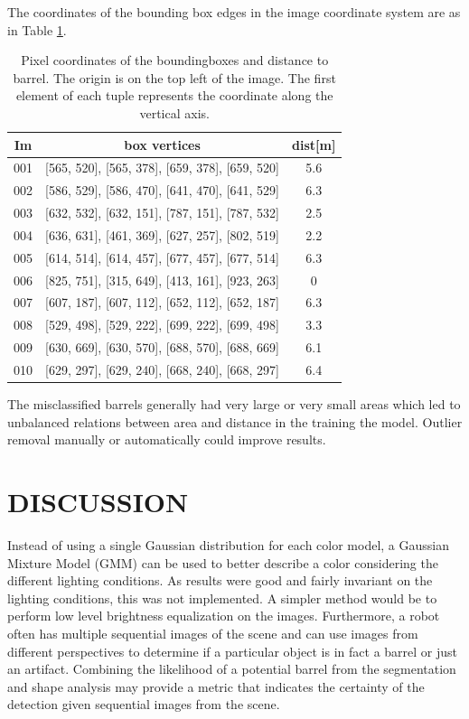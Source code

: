 \documentclass[letterpaper, 10 pt, conference]{ieeeconf}  %
\begin{document}
The coordinates of the bounding box edges in the image coordinate system are as in Table \ref{boundingboxes}.
\begin{table}[h]
\caption{Pixel coordinates of the boundingboxes and distance to barrel. The origin is on the top left of the image. The first element of each tuple represents the coordinate along the vertical axis.}
\label{boundingboxes}
\begin{center}
\begin{tabular}{|c|c|c|}
\hline
Im & box vertices & dist[m]\\
\hline
001 & [565, 520],
       [565, 378],
       [659, 378],
       [659, 520] & 5.6\\
002 & [586, 529],
       [586, 470],
       [641, 470],
       [641, 529] & 6.3\\
003 & [632, 532],
       [632, 151],
       [787, 151],
       [787, 532] & 2.5\\
004 & [636, 631],
       [461, 369],
       [627, 257],
       [802, 519] & 2.2\\
005 & [614, 514],
       [614, 457],
       [677, 457],
       [677, 514] & 6.3\\
006 & [825, 751],
       [315, 649],
       [413, 161],
       [923, 263] & 0\\
007 & [607, 187],
       [607, 112],
       [652, 112],
       [652, 187] & 6.3\\
008 & [529, 498],
       [529, 222],
       [699, 222],
       [699, 498] & 3.3\\
009 & [630, 669],
       [630, 570],
       [688, 570],
       [688, 669] & 6.1\\
010 & [629, 297],
       [629, 240],
       [668, 240],
       [668, 297] & 6.4\\
\hline     
\end{tabular}
\end{center}
\end{table}

The misclassified barrels generally had very large or very small areas which led to unbalanced relations between area and distance in the training the model. Outlier removal manually or automatically could improve results.

\section{DISCUSSION}
Instead of using a single Gaussian distribution for each color model, a Gaussian Mixture Model (GMM) can be used to better describe a color considering the different lighting conditions. As results were good and fairly invariant on the lighting conditions, this was not implemented. A simpler method would be to perform low level brightness equalization on the images. Furthermore, a robot often has multiple sequential images of the scene and can use images from different perspectives to determine if a particular object is in fact a barrel or just an artifact. Combining the likelihood of a potential barrel from the segmentation and  shape analysis may provide a metric that indicates the certainty of the detection given sequential images from the scene.
\end{document}
